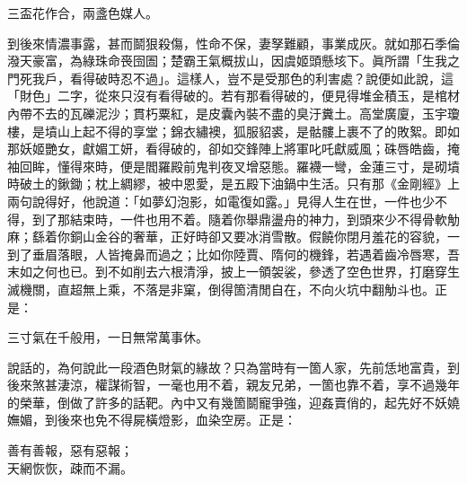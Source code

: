 \begin{myquote}
三盃花作合，兩盞色媒人。
\end{myquote}

到後來情濃事露，甚而鬬狠殺傷，{}性命不保，妻孥難顧，事業成灰。就如那石季倫潑天豪富，為綠珠命䘮囹圄；楚霸王氣概拔山，因虞姬頭懸垓下。眞所謂「生我之門死我戶，看得破時忍不過」。這樣人，豈不是受那色的利害處？說便如此說，這「財色」二字，從來只沒有看得破的。{}若有那看得破的，便見得堆金積玉，是棺材內帶不去的瓦礫泥沙；貫朽粟紅，是皮囊內裝不盡的臭汙糞土。高堂廣廈，玉宇瓊樓，是墳山上起不得的享堂；錦衣繡襖，狐服貂裘，是骷髏上裹不了的敗絮。即如那妖姬艷女，獻媚工妍，看得破的，卻如交鋒陣上將軍叱吒獻威風；硃唇皓齒，掩袖回眸，懂得來時，便是閻羅殿前鬼判夜叉增惡態。羅襪一彎，金蓮三寸，是砌墳時破土的鍬鋤；{}枕上綢繆，被中恩愛，是五殿下油鍋中生活。只有那《金剛經》上兩句說得好，他說道：「如夢幻泡影，如電復如露。」見得人生在世，一件也少不得，到了那結束時，一件也用不着。隨着你舉鼎盪舟的神力，到頭來少不得骨軟觔麻；繇着你銅山金谷的奢華，正好時卻又要冰消雪散。假饒你閉月羞花的容貌，一到了垂眉落眼，人皆掩鼻而過之；比如你陸賈、隋何的機鋒，若遇着齒冷唇寒，吾末如之何也已。{}到不如削去六根清淨，{}披上一領袈裟，參透了空色世界，打磨穿生滅機關，直超無上乘，不落是非窠，倒得箇清閒自在，不向火坑中翻觔斗也。正是：

\begin{myquote}
三寸氣在千般用，一日無常萬事休。
\end{myquote}

說話的，為何說此一段酒色財氣的緣故？只為當時有一箇人家，先前恁地富貴，到後來煞甚淒涼，權謀術智，一毫也用不着，親友兄弟，一箇也靠不着，享不過幾年的榮華，倒做了許多的話靶。內中又有幾箇鬬寵爭強，迎姦賣俏的，起先好不妖嬈嫵媚，到後來也免不得屍橫燈影，血染空房。正是：

\begin{myquote}
善有善報，惡有惡報；\\天網恢恢，疎而不漏。
\end{myquote}

